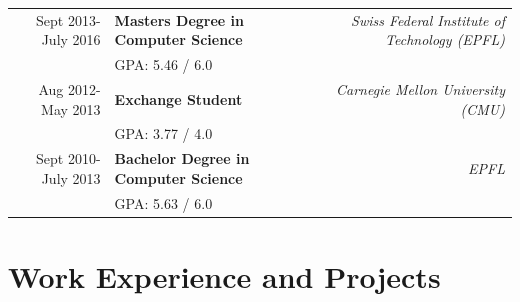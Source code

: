 \documentclass[a4paper,11pt]{article} %
\begin{document}
\begin{tabularx}{\textwidth}{r X r} 	
Sept 2013-July 2016 & 
\textbf{Masters Degree in Computer Science} & 
\textit{Swiss Federal Institute of Technology (EPFL)}\\
&\footnotesize \textsc{GPA}: 5.46 / 6.0\\


Aug 2012-May 2013 & 
\textbf{Exchange Student} &
\textit{Carnegie Mellon University (CMU)}\\
&\footnotesize \textsc{GPA}: 3.77 / 4.0\\


Sept 2010-July 2013 & 
\textbf{Bachelor Degree in Computer Science} & 
\textit{ EPFL }\\
&\footnotesize \textsc{GPA}: 5.63 / 6.0\\


\end{tabularx}


\section{Work Experience and Projects}
\end{document}
